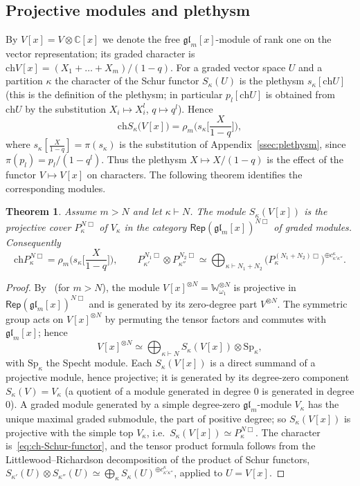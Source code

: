 \documentclass[11pt]{amsart}
\numberwithin{equation}{section}
\newtheorem{theorem}[equation]{Theorem}
\theoremstyle{definition}
\newcommand{\gl}{\mathfrak{gl}}
\newcommand{\bW}{\mathbb{W}}          %
\newcommand{\ch}{\mathrm{ch}}
\newcommand{\Rep}{\mathsf{Rep}}
\begin{document}
	\subsection{Projective modules and plethysm}\label{ssec:app-projective}
	
	By $V[x]=V\otimes\mathbb{C}[x]$ we denote the free $\gl_m[x]$-module of rank one on the vector representation; its graded character is $\ch V[x]=(X_1+\dots+X_m)/(1-q)$. For a graded vector space $U$ and a partition $\kappa$ the character of the Schur functor $S_\kappa(U)$ is the plethysm $s_\kappa[\ch U]$ (this is the definition of the plethysm; in particular $p_l[\ch U]$ is obtained from $\ch U$ by the substitution $X_i\mapsto X_i^l$, $q\mapsto q^l$). Hence
	\begin{equation}\label{eq:ch-Schur-functor}
		\ch S_\kappa\big(V[x]\big)=\rho_m\Big(s_\kappa\Big[\frac X{1-q}\Big]\Big),
	\end{equation}
	where $s_\kappa[\frac X{1-q}]=\pi(s_\kappa)$ is the substitution of Appendix~\ref{ssec:plethysm}, since $\pi(p_l)=p_l/(1-q^l)$. Thus the plethysm $X\mapsto X/(1-q)$ is the effect of the functor $V\mapsto V[x]$ on characters. The following theorem identifies the corresponding modules.
	
	\begin{theorem}\label{thm:projectives-plethysm}
		Assume $m>N$ and let $\kappa\vdash N$. The module $S_\kappa(V[x])$ is the projective cover $P_\kappa^{N\Box}$ of $V_\kappa$ in the category $\Rep(\gl_m[x])^{N\Box}$ of graded modules. Consequently
		\[
		\ch P_\kappa^{N\Box}=\rho_m\Big(s_\kappa\Big[\frac X{1-q}\Big]\Big),\qquad P_{\kappa'}^{N_1\Box}\otimes P_{\kappa''}^{N_2\Box}\simeq\bigoplus_{\kappa\vdash N_1+N_2}\big(P^{(N_1+N_2)\Box}_{\kappa}\big)^{\oplus c^\kappa_{\kappa'\kappa''}}.
		\]
	\end{theorem}
	\begin{proof}
		By~\cite{FKhM} (for $m>N$), the module $V[x]^{\otimes N}=\bW_{\omega_1}^{\otimes N}$ is projective in $\Rep(\gl_m[x])^{N\Box}$ and is generated by its zero-degree part $V^{\otimes N}$. The symmetric group acts on $V[x]^{\otimes N}$ by permuting the tensor factors and commutes with $\gl_m[x]$; hence
		\[
		V[x]^{\otimes N}\simeq\bigoplus_{\kappa\vdash N}S_\kappa(V[x])\otimes\mathrm{Sp}_\kappa,
		\]
		with $\mathrm{Sp}_\kappa$ the Specht module. Each $S_\kappa(V[x])$ is a direct summand of a projective module, hence projective; it is generated by its degree-zero component $S_\kappa(V)=V_\kappa$ (a quotient of a module generated in degree $0$ is generated in degree $0$). A graded module generated by a simple degree-zero $\gl_m$-module $V_\kappa$ has the unique maximal graded submodule, the part of positive degree; so $S_\kappa(V[x])$ is projective with the simple top $V_\kappa$, i.e.\ $S_\kappa(V[x])\simeq P_\kappa^{N\Box}$. The character is~\eqref{eq:ch-Schur-functor}, and the tensor product formula follows from the Littlewood--Richardson decomposition of the product of Schur functors, $S_{\kappa'}(U)\otimes S_{\kappa''}(U)\simeq\bigoplus_\kappa S_\kappa(U)^{\oplus c^\kappa_{\kappa'\kappa''}}$, applied to $U=V[x]$.
	\end{proof}
	
\end{document}
